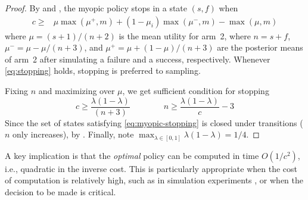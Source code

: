 \begin{hiddenproof}
	\begin{proof}
		By  and , the myopic policy stops in
		a state $(s,f)$ when
		\begin{align}
			c \ge &\mu\max(\mu^+,m) + (1-\mu_i)\max(\mu^-, m) - \max(\mu,m) \label{eq:stopping}
		\end{align}
		where $\mu=(s+1)/(n+2)$  is the mean utility for arm~2, where $n=s+f$,
		$\mu^- = \mu - \mu/(n+3)$, and $\mu^+ = \mu + (1-\mu)/(n+3)$
		are the posterior means of arm~2 after simulating a failure and a success,
		respectively.  Whenever \eqref{eq:stopping} holds, stopping is preferred to sampling.

		Fixing $n$ and maximizing over $\mu$, we get sufficient condition for stopping
		\begin{equation}
			c \ge \frac{\lambda(1-\lambda)}{(n+3)} \qquad\qquad   n\ge \frac{\lambda(1-\lambda)}{c} - 3  \label{eq:myopic-stopping}
		\end{equation}
		Since the set of states satisfying \eqref{eq:myopic-stopping} is closed under
		transitions ($n$ only increases), by .  Finally, note $\max_{\lambda\in[0,1]} \lambda(1-\lambda)=1/4$.
	\end{proof}	
\end{hiddenproof}

A key implication is that the \emph{optimal} policy can be computed
in time $O(1/c^2)$, i.e., quadratic in the inverse cost.  This is particularly appropriate when the cost of 
computation is relatively high, such as in simulation experiments \citep{Swisher+et+al:2003},
or when the decision to be made is critical. 

